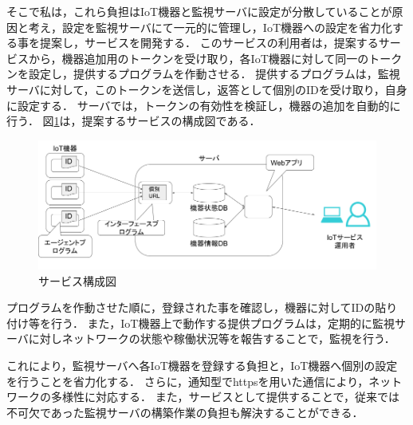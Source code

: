 そこで私は，これら負担はIoT機器と監視サーバに設定が分散していることが原因と考え，設定を監視サーバにて一元的に管理し，IoT機器への設定を省力化する事を提案し，サービスを開発する．
このサービスの利用者は，提案するサービスから，機器追加用のトークンを受け取り，各IoT機器に対して同一のトークンを設定し，提供するプログラムを作動させる．
提供するプログラムは，監視サーバに対して，このトークンを送信し，返答として個別のIDを受け取り，自身に設定する．
サーバでは，トークンの有効性を検証し，機器の追加を自動的に行う．
図\ref{fig:prop_diag}は，提案するサービスの構成図である．
\begin{figure}[htbp]
\includegraphics[width=16cm]{images/prop_diag.png}
\caption{サービス構成図}
\label{fig:prop_diag}
\end{figure}
\medskip

プログラムを作動させた順に，登録された事を確認し，機器に対してIDの貼り付け等を行う．
また，IoT機器上で動作する提供プログラムは，定期的に監視サーバに対しネットワークの状態や稼働状況等を報告することで，監視を行う．

これにより，監視サーバへ各IoT機器を登録する負担と，IoT機器へ個別の設定を行うことを省力化する．
さらに，通知型でhttpsを用いた通信により，ネットワークの多様性に対応する．
また，サービスとして提供することで，従来では不可欠であった監視サーバの構築作業の負担も解決することができる．


